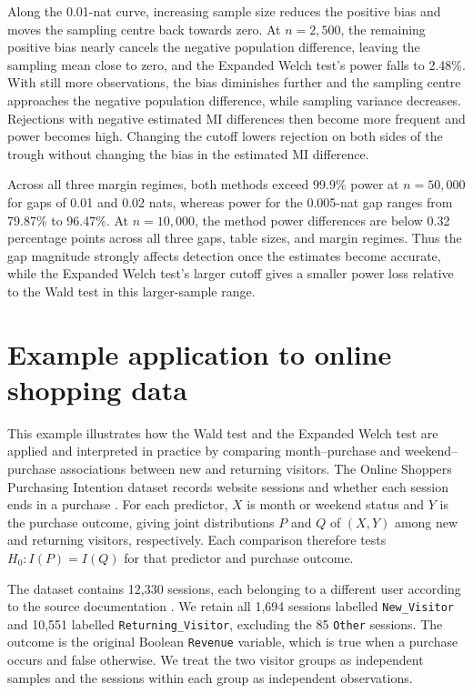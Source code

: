 Along the 0.01-nat curve, increasing sample size reduces the positive
bias and moves the sampling centre back towards zero. At \(n=2{,}500\), the remaining positive
bias nearly cancels the negative population difference, leaving the
sampling mean close to zero, and the Expanded Welch test's power falls to 2.48\%.
With still more observations, the bias diminishes further and the
sampling centre approaches the negative population difference, while
sampling variance decreases. Rejections with negative estimated MI differences then become more frequent
and power becomes high. Changing the cutoff lowers rejection on both sides
of the trough without changing the bias in the estimated MI difference.

Across all three margin regimes, both methods exceed 99.9\% power at
\(n=50{,}000\) for gaps of 0.01 and 0.02 nats, whereas power for the
0.005-nat gap ranges from 79.87\% to 96.47\%. At \(n=10{,}000\),
the method power differences are below 0.32 percentage points across all
three gaps, table sizes, and margin regimes. Thus the gap magnitude strongly
affects detection once the estimates become accurate, while the Expanded Welch test's larger cutoff gives a smaller power loss
relative to the Wald test in this
larger-sample range.

\section{Example application to online shopping data}
\label{sec:shoppers-application}

This example illustrates how the Wald test and the Expanded Welch test are applied
and interpreted in practice by comparing month--purchase and
weekend--purchase associations between new and returning visitors.
The Online Shoppers Purchasing Intention dataset records website sessions
and whether each session ends in a purchase \citep{sakar2018}. For each predictor,
\(X\) is month or weekend status and \(Y\) is the purchase outcome,
giving joint distributions \(P\) and \(Q\) of \((X,Y)\) among new
and returning visitors, respectively. Each comparison therefore tests
\(H_0:I(P)=I(Q)\) for that predictor and purchase outcome.

The dataset contains 12,330 sessions, each belonging to a different user
according to the source documentation \citep{sakar2018}. We retain all
1,694 sessions labelled \texttt{New\_Visitor} and 10,551 labelled
\texttt{Returning\_Visitor}, excluding the 85 \texttt{Other} sessions.
The outcome is the original Boolean \texttt{Revenue} variable, which is
true when a purchase occurs and false otherwise. We treat the two visitor
groups as independent samples and the sessions within each group as
independent observations.

